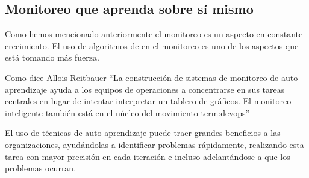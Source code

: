 \subsection{Monitoreo que aprenda sobre sí mismo}
\label{que-aprenda}

Como hemos mencionado anteriormente el monitoreo es un aspecto en constante
crecimiento. El uso de algoritmos de  en el monitoreo es
uno de los aspectos que está tomando más fuerza.

Como dice Allois Reitbauer “La construcción de sistemas de monitoreo de
auto-aprendizaje ayuda a los equipos de operaciones a concentrarse en sus tareas
centrales en lugar de intentar interpretar un tablero de gráficos. El monitoreo
inteligente también está en el núcleo del movimiento \gls{term:devops}”
\cite[Prefacio]{monitoreo:anomaly_detection_for_monitoring}

El uso de técnicas de auto-aprendizaje puede traer grandes beneficios a las
organizaciones, ayudándolas a identificar problemas rápidamente, realizando esta
tarea con mayor precisión en cada iteración e incluso adelantándose a que los
problemas ocurran.
